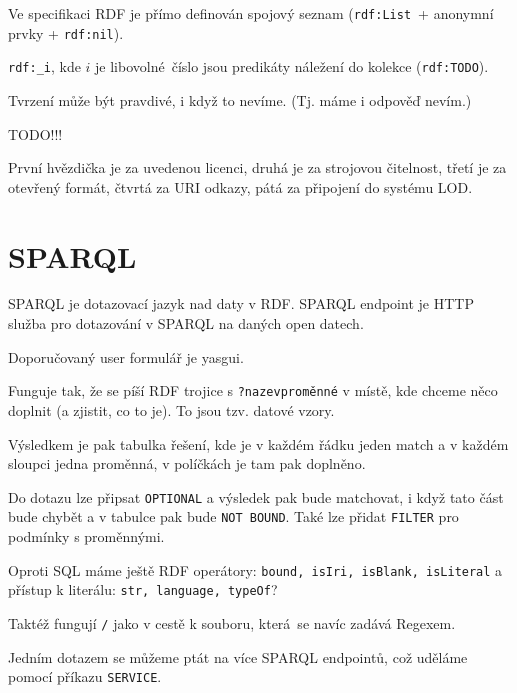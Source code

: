\documentclass[12pt]{article}					%
\begin{document}
\begin{definice}
	Ve specifikaci RDF je přímo definován spojový seznam (\verb|rdf:List| + anonymní prvky + \verb|rdf:nil|).

	\verb|rdf:_i|, kde $i$ je libovolné číslo jsou predikáty náležení do kolekce (\verb|rdf:TODO|).
\end{definice}

\begin{definice}
	Tvrzení může být pravdivé, i když to nevíme. (Tj. máme i odpověď nevím.)
\end{definice}

TODO!!!


\begin{definice}
	První hvězdička je za uvedenou licenci, druhá je za strojovou čitelnost, třetí je za otevřený formát, čtvrtá za URI odkazy, pátá za připojení do systému LOD.
\end{definice}

\section{SPARQL}
\begin{definice}[SPARQL]
	SPARQL je dotazovací jazyk nad daty v RDF. SPARQL endpoint je HTTP služba pro dotazování v SPARQL na daných open datech.

	\begin{poznamkain}
		Doporučovaný user formulář je yasgui.
	\end{poznamkain}

	Funguje tak, že se píší RDF trojice s \verb|?nazevproměnné| v místě, kde chceme něco doplnit (a zjistit, co to je). To jsou tzv. datové vzory.

	Výsledkem je pak tabulka řešení, kde je v každém řádku jeden match a v každém sloupci jedna proměnná, v políčkách je tam pak doplněno.

	Do dotazu lze připsat \verb|OPTIONAL| a výsledek pak bude matchovat, i když tato část bude chybět a v tabulce pak bude \verb|NOT BOUND|. Také lze přidat \verb|FILTER| pro podmínky s proměnnými.

	Oproti SQL máme ještě RDF operátory: \verb|bound, isIri, isBlank, isLiteral| a přístup k literálu: \verb|str, language, typeOf|?

	Taktéž fungují \verb|/| jako v cestě k souboru, která se navíc zadává Regexem.

	Jedním dotazem se můžeme ptát na více SPARQL endpointů, což uděláme pomocí příkazu \verb|SERVICE|.
\end{definice}
\end{document}
